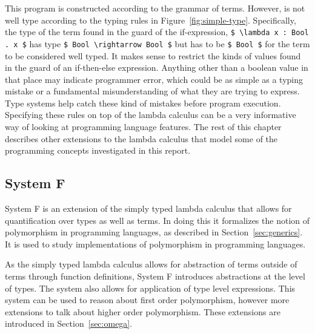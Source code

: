 This program is constructed according to the grammar of terms. However, is not
well type according to the typing rules in Figure~\ref{fig:simple-type}.
Specifically, the type of the term found in the guard of the if-expression,
\lstinline[mathescape]{$ \lambda x : Bool . x $} has type
\lstinline[mathescape]{$ Bool \rightarrow Bool $} but has to be
\lstinline[mathescape]{$ Bool $} for the term to be considered well typed.
It makes sense to restrict the kinds of values found in the guard of an if-then-else
expression. Anything other than a boolean value in that place may indicate
programmer error, which could be as simple as a typing mistake or a fundamental
misunderstanding of what they are trying to express. Type systems help catch
these kind of mistakes before program execution. Specifying these rules on top
of the lambda calculus can be a very informative way of looking at programming
language features. The rest of this chapter describes other extensions to the
lambda calculus that model some of the programming concepts investigated in
this report.

\subsection{System F}
System F is an extension of the simply typed lambda calculus \cite{tapl} that
allows for quantification over types as well as terms. In doing this it
formalizes the notion of polymorphism in programming languages, as described in
Section~\ref{sec:generics}. It is used to study implementations of polymorphism
in programming languages.

As the simply typed lambda calculus allows for abstraction of terms outside of
terms through function definitions, System F introduces abstractions at the
level of types. The system also allows for application of type level
expressions. This system can be used to reason about first order polymorphism,
however more extensions to talk about higher order polymorphism. These extensions
are introduced in Section~\ref{sec:omega}.

